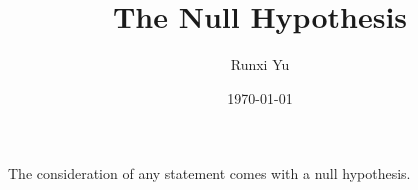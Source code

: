 \documentclass{scrartcl}
\title{The Null Hypothesis}
\author{Runxi Yu}
\date{\today}
\begin{document}
\maketitle

The consideration of any statement comes with a null hypothesis.
\end{document}
